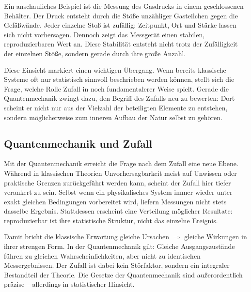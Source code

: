 Ein anschauliches Beispiel ist die Messung des Gasdrucks in einem geschlossenen Behälter.
Der Druck entsteht durch die Stöße unzähliger Gasteilchen
gegen die Gefäßwände.
Jeder einzelne Stoß ist zufällig:
Zeitpunkt, Ort und Stärke
lassen sich nicht vorhersagen.
Dennoch zeigt das Messgerät
einen stabilen, reproduzierbaren Wert an.
Diese Stabilität entsteht nicht trotz der Zufälligkeit
der einzelnen Stöße,
sondern gerade durch ihre große Anzahl.

Diese Einsicht markiert einen wichtigen Übergang.
Wenn bereits klassische Systeme
oft nur statistisch sinnvoll beschrieben werden können,
stellt sich die Frage,
welche Rolle Zufall in noch fundamentalerer Weise spielt.
Gerade die Quantenmechanik
zwingt dazu,
den Begriff des Zufalls neu zu bewerten:
Dort scheint er nicht nur
aus der Vielzahl der beteiligten Elemente zu entstehen,
sondern möglicherweise
zum inneren Aufbau der Natur selbst zu gehören.


\subsection{Quantenmechanik und Zufall}

Mit der Quantenmechanik erreicht die Frage nach dem Zufall eine neue Ebene.
Während in klassischen Theorien Unvorhersagbarkeit
meist auf Unwissen
oder praktische Grenzen zurückgeführt werden kann,
scheint der Zufall hier tiefer verankert zu sein.
Selbst wenn ein physikalisches System
immer wieder unter exakt gleichen Bedingungen vorbereitet wird,
liefern Messungen nicht stets dasselbe Ergebnis.
Stattdessen erscheint eine Verteilung möglicher Resultate:
reproduzierbar ist ihre statistische Struktur,
nicht das einzelne Ereignis.

Damit bricht die klassische Erwartung
\glqq gleiche Ursachen $\Rightarrow$ gleiche Wirkungen\grqq{}
in ihrer strengen Form.
In der Quantenmechanik gilt:
Gleiche Ausgangszustände
führen zu gleichen Wahrscheinlichkeiten,
aber nicht zu identischen Messergebnissen.
Der Zufall ist dabei kein Störfaktor,
sondern ein integraler Bestandteil der Theorie.
Die Gesetze der Quantenmechanik
sind außerordentlich präzise --
allerdings in statistischer Hinsicht.

